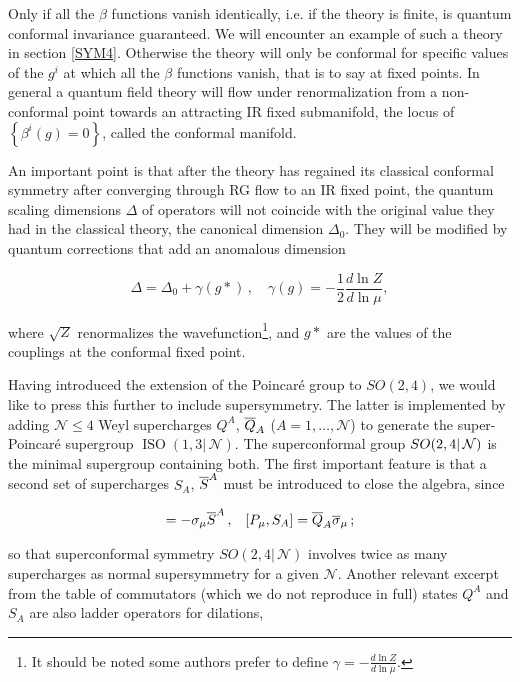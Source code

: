 Only if all the $\beta$ functions vanish identically, i.e. if the theory is finite, is quantum conformal invariance guaranteed. We will encounter an example of such a theory in section \ref{SYM4}. Otherwise the theory will only be conformal for specific values of the $g^i$ at which all the $\beta$ functions vanish, that is to say at fixed points. In general a quantum field theory will flow under renormalization from a non-conformal point towards an attracting IR fixed submanifold, the locus of $\left\{ \beta^i(g) = 0 \right\}$, called the conformal manifold.

An important point is that after the theory has regained its classical conformal symmetry after converging through RG flow to an IR fixed point, the quantum scaling dimensions $\Delta$ of operators will not coincide with the original value they had in the classical theory, the canonical dimension $\Delta_0$. They will be modified by quantum corrections that add an anomalous dimension

\begin{equation}
	\Delta = \Delta_0 + \gamma(g*)\,,\quad \gamma(g) = - \frac{1}{2}\frac{d \ln Z}{d \ln\mu},
	\label{}
\end{equation}

where $\sqrt Z$ renormalizes the wavefunction\footnote{It should be noted some authors prefer to define $\gamma = - \frac{d\ln Z}{d \ln \mu}$.}, and $g*$ are the values of the couplings at the conformal fixed point.

Having introduced the extension of the Poincar\'e group to $SO(2,4)$, we would like to press this further to include supersymmetry. The latter is implemented by adding $\mathcal{N} \leq 4$ Weyl supercharges $Q^A$, $\overline{Q}_A$ ($A=1,\ldots,\mathcal{N}$) to generate the super-Poincar\'e supergroup $\operatorname{ISO}(1,3|\,\mathcal{N})$. The superconformal group $SO(2,4|\,\mathcal{N})$ is the minimal supergroup containing both. The first important feature is that a second set of supercharges $S_A$, $\overline{S}^A$ must be introduced to close the algebra, since

\begin{align}
	[K_\mu , Q^A] = - \sigma_\mu \scj{S}^A\,, && [P_\mu, S_A] = \scj{Q}_A  \scj\sigma_\mu \,;
	\label{}
\end{align}

so that superconformal symmetry $SO(2,4|\,\mathcal{N})$ involves twice as many supercharges as normal supersymmetry for a given $\mathcal{N}$. Another relevant excerpt from the table of commutators (which we do not reproduce in full) states $Q^A$ and $S_A$ are also ladder operators for dilations,

